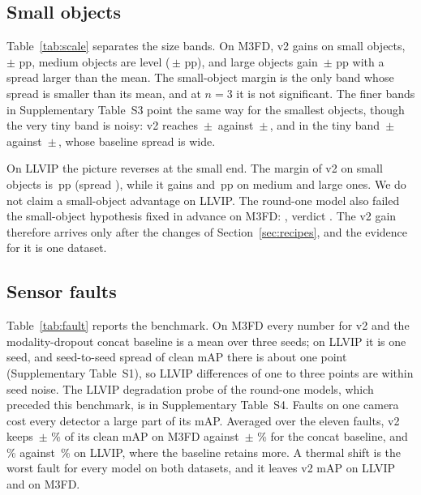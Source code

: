 \subsection{Small objects}
\label{sec:small}
Table~\ref{tab:scale} separates the size bands. On M3FD, v2 gains on small objects, \marMfdVtwoVsConcatMdMeanApSmall{}\,$\pm$\,\marMfdVtwoVsConcatMdStdApSmall{}\,pp, medium objects are level (\marMfdVtwoVsConcatMdMeanApMedium{}\,$\pm$\,\marMfdVtwoVsConcatMdStdApMedium{}\,pp), and large objects gain \marMfdVtwoVsConcatMdMeanApLarge{}\,$\pm$\,\marMfdVtwoVsConcatMdStdApLarge{}\,pp with a spread larger than the mean. The small-object margin is the only band whose spread is smaller than its mean, and at $n=3$ it is not significant. The finer bands in Supplementary Table~S3 point the same way for the smallest objects, though the very tiny band is noisy: v2 reaches \resMfdCffmVtwoMeanApBandVeryTiny{}\,$\pm$\,\resMfdCffmVtwoStdApBandVeryTiny{} against \resMfdConcatMdMeanApBandVeryTiny{}\,$\pm$\,\resMfdConcatMdStdApBandVeryTiny{}, and in the tiny band \resMfdCffmVtwoMeanApBandTiny{}\,$\pm$\,\resMfdCffmVtwoStdApBandTiny{} against \resMfdConcatMdMeanApBandTiny{}\,$\pm$\,\resMfdConcatMdStdApBandTiny{}, whose baseline spread is wide.

On LLVIP the picture reverses at the small end. The margin of v2 on small objects is \marLlvipVtwoVsConcatMdMeanApSmall{}\,pp (spread \marLlvipVtwoVsConcatMdStdApSmall{}), while it gains \marLlvipVtwoVsConcatMdMeanApMedium{} and \marLlvipVtwoVsConcatMdMeanApLarge{}\,pp on medium and large ones. We do not claim a small-object advantage on LLVIP. The round-one model also failed the small-object hypothesis fixed in advance on M3FD: \hypPhThreeEvidence{}, verdict \hypPhThreeVerdict{}. The v2 gain therefore arrives only after the changes of Section~\ref{sec:recipes}, and the evidence for it is one dataset.



\subsection{Sensor faults}
\label{sec:faults}
Table~\ref{tab:fault} reports the benchmark. On M3FD every number for v2 and the modality-dropout concat baseline is a mean over three seeds; on LLVIP it is one seed, and seed-to-seed spread of clean mAP there is about one point (Supplementary Table~S1), so LLVIP differences of one to three points are within seed noise. The LLVIP degradation probe of the round-one models, which preceded this benchmark, is in Supplementary Table~S4. Faults on one camera cost every detector a large part of its mAP. Averaged over the eleven faults, v2 keeps \fltMfdCffmVtwoMeanRetainedSevThreePercent{}\,$\pm$\,\fltMfdCffmVtwoStdRetainedSevThreePercent{}\,\% of its clean mAP on M3FD against \fltMfdConcatMdMeanRetainedSevThreePercent{}\,$\pm$\,\fltMfdConcatMdStdRetainedSevThreePercent{}\,\% for the concat baseline, and \fltLlvipCffmVtwoRetainedSevThreePercent{}\,\% against \fltLlvipConcatMdRetainedSevThreePercent{}\,\% on LLVIP, where the baseline retains more. A thermal shift is the worst fault for every model on both datasets, and it leaves v2 \fltLlvipCffmVtwoWorstSevThreeMap{} mAP on LLVIP and \fltMfdCffmVtwoWorstSevThreeMap{} on M3FD.

